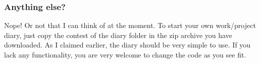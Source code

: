 \subsubsection*{Anything else?}
Nope! Or not that I can think of at the moment. To start your own work/project diary, just copy the contest of the diary folder in the zip archive you have downloaded. As I claimed earlier, the diary should be very simple to use. If you lack any functionality, you are very welcome to change the code as you see fit.
